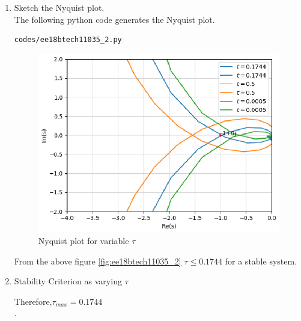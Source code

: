 \begin{enumerate}[label=\thesubsection.\arabic*.,ref=\thesubsection.\theenumi]
\item Sketch the Nyquist plot.
\\
\solution The following python code generates the Nyquist plot.
\begin{lstlisting}
codes/ee18btech11035_2.py
\end{lstlisting}

\begin{figure}[!h]
  \includegraphics[width=\columnwidth]{./figs/ee18btech11035_2.eps}
  \caption{Nyquist plot for variable $\tau$}
  \label{fig:ee18btech11035_2}
\end{figure}

From the above figure \eqref{fig:ee18btech11035_2} $\tau \le 0.1744$ for a stable system.

\item Stability Criterion as varying $\tau$ 
\\
\solution 
\begin{table}[!ht]
\centering

\caption{}
\label{table:ee18btech11035_table}
\end{table}

Therefore,$\tau_{max} = 0.1744 $\\.
\end{enumerate}
